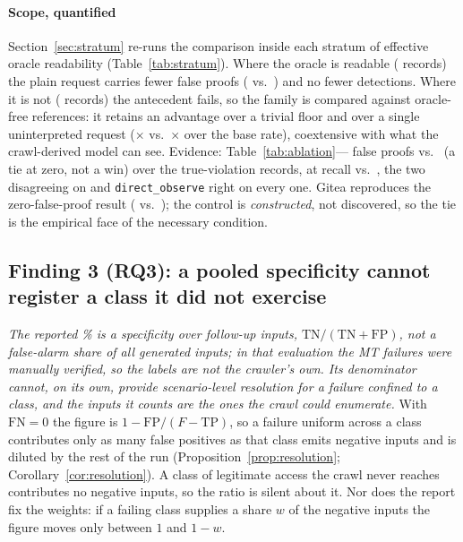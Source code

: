 \paragraph{Scope, quantified}
Section~\ref{sec:stratum} re-runs the comparison inside each stratum of effective oracle
readability (Table~\ref{tab:stratum}). Where the oracle is readable (\MiiNOn{} records)
the plain request carries fewer false proofs (\MiiOnDirectObserveFP{} vs.~\MiiOnVTwoFP{})
and no fewer detections. Where it is not (\MiiNOff{} records) the antecedent fails, so the
family is compared against oracle-free references: it retains an advantage over a trivial
floor and over a single uninterpreted request (\MiiLiftVTwo{}$\times$
vs.~\MiiLiftObsSuccess{}$\times$ over the base rate), coextensive with what the
crawl-derived model can see. Evidence: Table~\ref{tab:ablation}---\ResAbDirectObserveFP{}
false proofs vs.~\ResAbVThreeFP{} (a tie at zero, not a win) over the \ResAbNBola{}
true-violation records, at recall \ResAbDirectObserveRec{} vs.~\ResAbVThreeRec{}, the two
disagreeing on \ResAbDisagreementN{} and \texttt{direct\_observe} right on every one. Gitea
reproduces the zero-false-proof result (\ResRsDirectObserveFp{} vs.~\ResRsVThreeFp{}); the
control is \emph{constructed}, not discovered, so the tie is the empirical face of the
necessary condition.

\subsection{Finding 3 (RQ3): a pooled specificity cannot register a class it did not exercise}
\label{sec:resolution2}

\emph{The reported \ResLitReportedSpecPct{}\% is a specificity over follow-up inputs,
$\mathrm{TN}/(\mathrm{TN}+\mathrm{FP})$, not a false-alarm share of all generated inputs;
in that evaluation the MT failures were manually verified, so the labels are not the
crawler's own. Its denominator cannot, on its own, provide scenario-level resolution for a
failure confined to a class, and the inputs it counts are the ones the crawl could
enumerate.} With $\mathrm{FN}=0$ the figure is $1-\mathrm{FP}/(F-\mathrm{TP})$, so a
failure uniform across a class contributes only as many false positives as that class emits
negative inputs and is diluted by the rest of the run
(Proposition~\ref{prop:resolution}; Corollary~\ref{cor:resolution}). A class of legitimate
access the crawl never reaches contributes no negative inputs, so the ratio is silent
about it. Nor does the report fix the weights: if a failing class supplies a share $w$ of
the negative inputs the figure moves only between $1$ and $1-w$.

